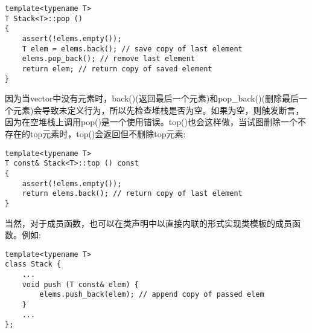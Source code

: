 \begin{lstlisting}[style=styleCXX]
template<typename T>
T Stack<T>::pop ()
{
	assert(!elems.empty());
	T elem = elems.back(); // save copy of last element
	elems.pop_back(); // remove last element
	return elem; // return copy of saved element
}
\end{lstlisting}

因为当vector中没有元素时，back()(返回最后一个元素)和pop\_back()(删除最后一个元素)会导致未定义行为，所以先检查堆栈是否为空。如果为空，则触发断言，因为在空堆栈上调用pop()是一个使用错误。top()也会这样做，当试图删除一个不存在的top元素时，top()会返回但不删除top元素:

\begin{lstlisting}[style=styleCXX]
template<typename T>
T const& Stack<T>::top () const
{
	assert(!elems.empty());
	return elems.back(); // return copy of last element
}
\end{lstlisting}

当然，对于成员函数，也可以在类声明中以直接内联的形式实现类模板的成员函数。例如:

\begin{lstlisting}[style=styleCXX]
template<typename T>
class Stack {
	...
	void push (T const& elem) {
		elems.push_back(elem); // append copy of passed elem
	}
	...
};
\end{lstlisting}






